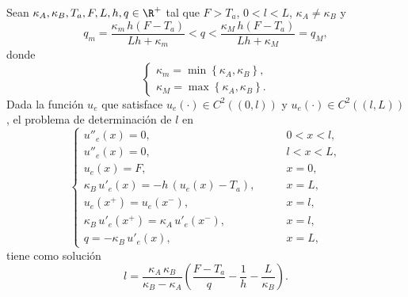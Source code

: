 \begin{theorem} \label{teorema_Sol_Aprox_l}
Sean $\kappa_A, \kappa_B, T_a, F, L,h,q \in \R^+$ tal que $F>T_a$, $0<l<L$, $\kappa_A \neq \kappa_B$ y
%
\begin{equation}
\label{cond_q}
q_m=\dfrac{\kappa_m \, h (F-T_a)}{Lh+\kappa_m}<q<\dfrac{\kappa_M \, h (F-T_a)}{Lh+\kappa_M}=q_M,
\end{equation}
%
donde
%
\begin{equation}
\label{cond_K_m_K_M}
\begin{cases}
\kappa_m=\min\left\{\kappa_A,\kappa_B\right\}, \\
\kappa_M=\max\left\{\kappa_A,\kappa_B\right\}.
\end{cases}
\end{equation}
%
Dada la funci\'on $u_e$ que satisface $u_e(\cdot) \in C^{2}\left((0,l)\right)$ y $u_e(\cdot) \in C^{2}\left((l,L)\right)$, el problema de determinaci\'on de $l$ en
%
\begin{equation}
\label{Ec_Problema_Estimacion_l}
\begin{cases} 
u''_{e}(x)=0, \qquad & 0<x<l, \\
u''_{e}(x)=0, \qquad & l<x<L, \\
u_{e}(x)=F, \qquad & x=0, \\
\kappa_B\,  u'_{e}(x)=-h\,(u_{e}(x)-T_a) , \qquad & x=L , \\
u_{e}(x^+)=u_{e}(x^-), \qquad & x=l , \\
\kappa_B \, u'_{e}(x^+)=\kappa_A \, u'_{e}(x^-), \qquad & x=l , \\
q=-\kappa_B \, u'_{e}(x) , \qquad & x=L,
\end{cases}
\end{equation}
%
tiene como soluci\'on  
%
\begin{equation}
\label{Sol_l}
l=\dfrac{\kappa_A \, \kappa_B}{\kappa_B-\kappa_A}\left(\dfrac{F-T_a}{q}-\dfrac{1}{h}-\dfrac{L}{\kappa_B}\right).
\end{equation}
%        
\end{theorem}
%
